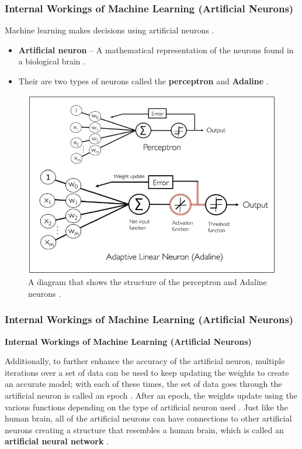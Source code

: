 \documentclass{beamer}
\begin{document}
\begin{frame}
\frametitle{Internal Workings of Machine Learning (Artificial Neurons)}
\scriptsize
Machine learning makes decisions using artificial neurons \cite{pythonML}.
\begin{itemize}
    \item  \textbf{Artificial neuron} -- A mathematical representation of the neurons found in a biological brain \cite{pythonML}.
    \item Their are two types of neurons called the \textbf{perceptron} and \textbf{Adaline} \cite{pythonML}.
\end{itemize}
\begin{figure}[h]
\centering
\includegraphics[scale=0.24]{neurons}
\caption{ \scriptsize A diagram that shows the structure of the perceptron and Adaline neurons \cite{Neuron}.}
\end{figure}
\end{frame}

\begin{frame}
\frametitle{Internal Workings of Machine Learning (Artificial Neurons)}
\footnotesize
\textbf{Internal Workings of Machine Learning (Artificial Neurons)}
\newline

 Additionally, to further enhance the accuracy of the artificial neuron, multiple iterations over a set of data can be used to keep updating the weights to create an accurate model; with each of these times, the set of data goes through the artificial neuron is called an epoch \cite{pythonML}.
\newline
\newline
After an epoch, the weights update using the various functions depending on the type of artificial neuron used \cite{pythonML}. 
\newline
\newline
Just like the human brain, all of the artificial neurons can have connections to other artificial neurons creating a structure that resembles a human brain, which is called an \textbf{ artificial neural network} \cite{pythonML}.

\end{frame}
\end{document}
